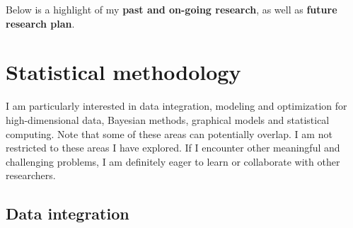 \documentclass[a4paper, 10pt]{article}
\begin{document}
Below is a highlight of my \textbf{past and on-going research}, as well as \textbf{future research plan}.

\section{Statistical methodology}
I am particularly interested in data integration, modeling and optimization for high-dimensional data, Bayesian methods, graphical models and statistical computing.
Note that some of these areas can potentially overlap.
I am not restricted to these areas I have explored.
If I encounter other meaningful and challenging problems,
I am definitely eager to learn or collaborate with other researchers.

\subsection{Data integration}
\end{document}
